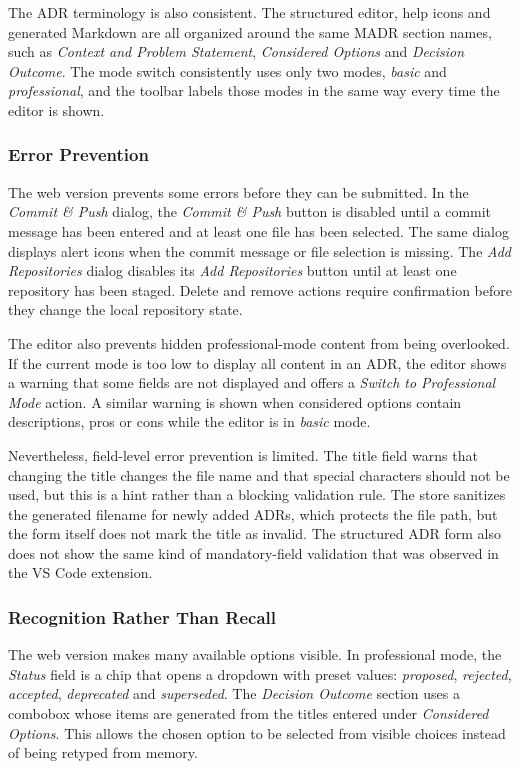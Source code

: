 \documentclass{article}
\begin{document}
The ADR terminology is also consistent. The structured editor, help icons and generated Markdown are all organized around the same MADR section names, such as \textit{Context and Problem Statement}, \textit{Considered Options} and \textit{Decision Outcome}. The mode switch consistently uses only two modes, \textit{basic} and \textit{professional}, and the toolbar labels those modes in the same way every time the editor is shown.

\subsubsection{Error Prevention}
The web version prevents some errors before they can be submitted. In the \textit{Commit \& Push} dialog, the \textit{Commit \& Push} button is disabled until a commit message has been entered and at least one file has been selected. The same dialog displays alert icons when the commit message or file selection is missing. The \textit{Add Repositories} dialog disables its \textit{Add Repositories} button until at least one repository has been staged. Delete and remove actions require confirmation before they change the local repository state.

The editor also prevents hidden professional-mode content from being overlooked. If the current mode is too low to display all content in an ADR, the editor shows a warning that some fields are not displayed and offers a \textit{Switch to Professional Mode} action. A similar warning is shown when considered options contain descriptions, pros or cons while the editor is in \textit{basic} mode.

Nevertheless, field-level error prevention is limited. The title field warns that changing the title changes the file name and that special characters should not be used, but this is a hint rather than a blocking validation rule. The store sanitizes the generated filename for newly added ADRs, which protects the file path, but the form itself does not mark the title as invalid. The structured ADR form also does not show the same kind of mandatory-field validation that was observed in the VS Code extension.

\subsubsection{Recognition Rather Than Recall}
The web version makes many available options visible. In professional mode, the \textit{Status} field is a chip that opens a dropdown with preset values: \textit{proposed}, \textit{rejected}, \textit{accepted}, \textit{deprecated} and \textit{superseded}. The \textit{Decision Outcome} section uses a combobox whose items are generated from the titles entered under \textit{Considered Options}. This allows the chosen option to be selected from visible choices instead of being retyped from memory.
\end{document}
